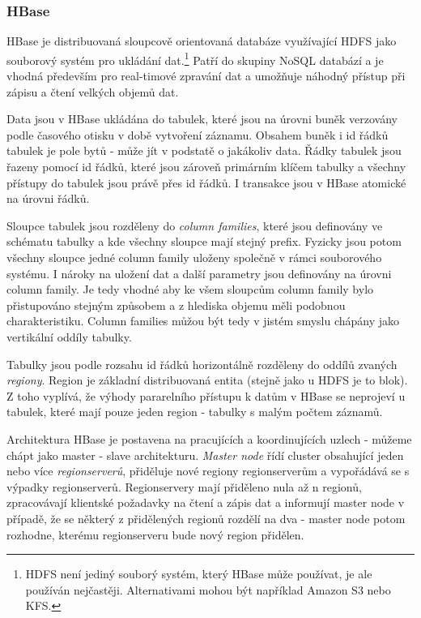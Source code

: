 \documentclass[11pt,twoside,a4paper]{book}
\begin{document}
		\subsubsection{HBase} \label{sec:hbase}
		 HBase je distribuovaná sloupcově orientovaná databáze využívající HDFS jako souborový systém pro ukládání dat.\footnote{HDFS není jediný souborý systém, který HBase může používat, je ale používán nejčastěji. Alternativami mohou být například Amazon S3 nebo KFS.} Patří do skupiny NoSQL databází a je vhodná především pro real-timové zpravání dat a umožňuje náhodný přístup při zápisu a čtení velkých objemů dat. \cite{hbase02}
		
		Data jsou v HBase ukládána do tabulek, které jsou na úrovni buněk verzovány podle časového otisku v době vytvoření záznamu. Obsahem buněk i id  řádků tabulek je pole bytů - může jít v podstatě o jakákoliv data. Řádky tabulek jsou řazeny pomocí id řádků, které jsou zároveň primárním klíčem tabulky a všechny přístupy do tabulek jsou právě přes id řádků. I transakce jsou v HBase atomické na úrovni řádků. 

		Sloupce tabulek jsou rozděleny do \textit{column families}, které jsou definovány ve schématu tabulky a kde všechny sloupce mají stejný prefix. Fyzicky jsou potom všechny sloupce jedné column family uloženy společně v rámci souborového systému. I nároky na uložení dat a další parametry jsou definovány na úrovni column family. Je tedy vhodné aby ke všem sloupcům column family bylo přistupováno stejným způsobem a z hlediska objemu měli podobnou charakteristiku. Column families můžou být tedy v jistém smyslu chápány jako vertikální oddíly tabulky.

		Tabulky jsou podle rozsahu id řádků horizontálně rozděleny do oddílů zvaných \textit{regiony}. Region je základní distribuovaná entita (stejně jako u HDFS je to blok). Z toho vyplívá, že výhody pararelního přístupu k datům v HBase se neprojeví u tabulek, které mají pouze jeden region - tabulky s malým počtem záznamů.

		Architektura HBase je postavena na pracujících a koordinujících uzlech - můžeme chápt jako master - slave architekturu. \textit{Master node} řídí cluster obsahující jeden nebo více \textit{regionserverů}, přiděluje nové regiony regionserverům a vypořádává se s výpadky regionserverů. Regionservery mají přiděleno nula až n regionů, zpracovávají klientské požadavky na čtení a zápis dat a informují master node v případě, že se některý z přidělených regionů rozdělí na dva - master node potom rozhodne, kterému regionserveru bude nový region přidělen. \cite{hbase01}
\end{document}
